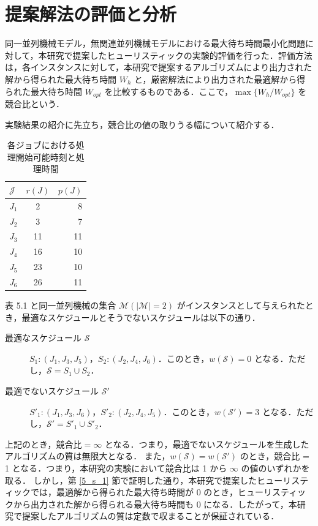 \documentclass[12pt]{optlab-bachelor}
\begin{document}
\section{提案解法の評価と分析}\label{5_s_3}
同一並列機械モデル，無関連並列機械モデルにおける最大待ち時間最小化問題に対して，本研究で提案したヒューリスティックの実験的評価を行った．評価方法は，各インスタンスに対して，本研究で提案するアルゴリズムにより出力された解から得られた最大待ち時間 $W_h$ と，厳密解法により出力された最適解から得られた最大待ち時間 $W_{opt}$ を比較するものである．ここで，$\max\{W_h/W_{opt}\}$ を競合比という．

実験結果の紹介に先立ち，競合比の値の取りうる幅について紹介する．
\begin{table}[htb]
  \begin{center}
    \begin{tabular}{|l|c|r|} \hline
      $\mathcal{J}$ & $r(J)$ & $p(J)$ \\ \hline \hline
      $J_1$ & 2 & 8 \\ \hline
      $J_2$ & 3 & 7 \\ \hline
      $J_3$ & 11 & 11 \\ \hline
      $J_4$ & 16 & 10 \\ \hline
      $J_5$ & 23 & 10 \\ \hline
      $J_6$ & 26 & 11 \\ \hline
    \end{tabular}
    \caption{各ジョブにおける処理開始可能時刻と処理時間}
  \end{center}
\end{table}

表 5.1 と同一並列機械の集合 $\mathcal{M} (|\mathcal{M}| = 2)$ がインスタンスとして与えられたとき，最適なスケジュールとそうでないスケジュールは以下の通り．
\begin{description}
  \item[最適なスケジュール $\mathcal{S}$] $S_1 : (J_1, J_3, J_5)$，$S_2 : (J_2, J_4, J_6)$．このとき，$w(\mathcal{S}) = 0$ となる．ただし，$\mathcal{S} = S_1 \cup S_2$．
  \item[最適でないスケジュール $\mathcal{S}'$] $S'_1 : (J_1, J_3, J_6)$，$S'_2 : (J_2, J_4, J_5)$．このとき，$w(\mathcal{S}') = 3$ となる．ただし，$\mathcal{S}' = S'_1 \cup S'_2$．
\end{description}

上記のとき，$\text{競合比} = \infty$ となる．つまり，最適でないスケジュールを生成したアルゴリズムの質は無限大となる．
また，$w(\mathcal{S}) = w(\mathcal{S}')$ のとき，競合比 = 1 となる．つまり，本研究の実験において競合比は 1 から $\infty$ の値のいずれかを取る．
しかし，第 \ref{5_s_1} 節で証明した通り，本研究で提案したヒューリスティックでは，最適解から得られた最大待ち時間が 0 のとき，ヒューリスティックから出力された解から得られる最大待ち時間も 0 になる．したがって，本研究で提案したアルゴリズムの質は定数で収まることが保証されている．
\end{document}
